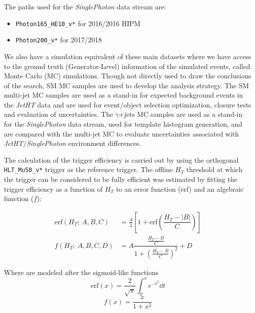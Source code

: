 The paths used for the \textit{SinglePhoton} data stream are:
\begin{itemize}
	\item \verb|Photon165_HE10_v*| for 2016/2016 HIPM
	\item \verb|Photon200_v*| for 2017/2018
\end{itemize}

We also have a simulation equivalent of these main datasets where we have access to the ground truth (Generator-Level) information of the simulated events, called Monte Carlo (MC) simulations.
Though not directly used to draw the conclusions of the search, SM MC samples are used to develop the analysis strategy. The SM multi-jet MC samples are used as a stand-in for expected background events in the \textit{JetHT} data and are used for event/object selection optimization, closure tests and evaluation of uncertainties. The $\gamma$+jets MC samples are used as a stand-in for the \textit{SinglePhoton} data stream, used for template histogram generation, and are compared with the multi-jet MC to evaluate uncertainties associated with \textit{JetHT}/\textit{SinglePhoton} environment differences\cite{CMS:2024gxp}.


The calculation of the trigger efficiency is carried out by using the orthogonal \verb|HLT_Mu50_v*| trigger as the reference trigger. The offline $H_T$ threshold at which the trigger can be considered to be fully efficient was estimated by fitting the trigger efficiency as a function of $H_T$ to an error function (erf) and an algebraic function ($f$):

\begin{align}
	\text{erf}(H_T ;\ A,B,C) & = \frac A2 \left[1+ \text{erf}\left(\dfrac{H_T - |B|}{C}\right) \right]\label{eq:erf} \\
	f(H_T ;\ A,B,C,D)        & = A \dfrac{\frac{H_T - B}{C}}{1+ \left(\frac{H_T - B}{C}\right)^2} + D \label{eq:alg}
\end{align}

Where  are modeled after the sigmoid-like functions
\[
	\text{erf}(x) = \frac{2}{\sqrt{\pi}} \int_0^x e^{-t^2} \dd{t}
\]
\[
	f(x)=\frac{x}{1+x^{2}}
\]


